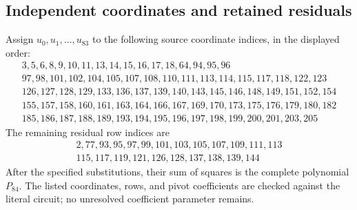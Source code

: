 \subsection{Independent coordinates and retained residuals}
Assign $u_0,u_1,\ldots,u_{83}$ to the following source coordinate indices, in the displayed order:
\[\begin{gathered}
3,5,6,8,9,10,11,13,14,15,16,17,18,64,94,95,96\\
97,98,101,102,104,105,107,108,110,111,113,114,115,117,118,122,123\\
126,127,128,129,133,136,137,139,140,143,145,146,148,149,151,152,154\\
155,157,158,160,161,163,164,166,167,169,170,173,175,176,179,180,182\\
185,186,187,188,189,193,194,195,196,197,198,199,200,201,203,205
\end{gathered}\]
The remaining residual row indices are
\[\begin{gathered}
2,77,93,95,97,99,101,103,105,107,109,111,113\\
115,117,119,121,126,128,137,138,139,144
\end{gathered}\]
After the specified substitutions, their sum of squares is the complete polynomial $P_{84}$. The listed coordinates, rows, and pivot coefficients are checked against the literal circuit; no unresolved coefficient parameter remains.
